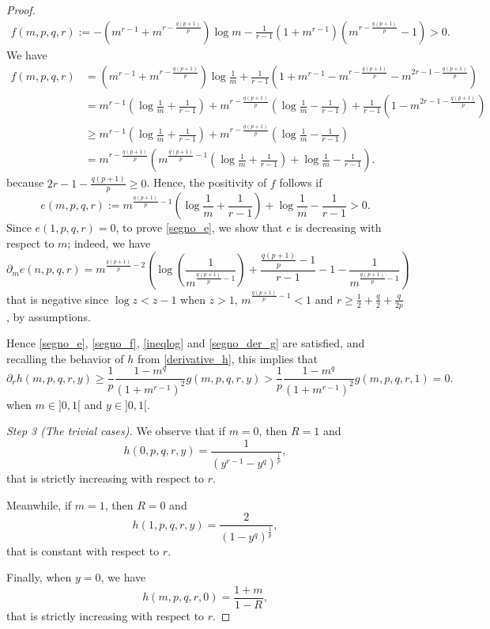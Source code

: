 \documentclass{amsart}
\theoremstyle{definition}
\theoremstyle{remark}
\newcommand{\de}{\partial}
\begin{document}
\begin{proof}
\begin{multline}
f(m,p,q,r):=-\left(m^{r-1}+m^{r-\frac{q(p+1)}p}\right)\log m - \frac1{r-1}\left(1+m^{r-1}\right)\left(m^{r-\frac{q(p+1)}p}-1\right) > 0.
\end{multline}
We have
\begin{equation*}
\begin{split}
f(m,p,q,r)&=\left(m^{r-1}+m^{r-\frac{q(p+1)}p}\right)\log\frac{1}{m} +\frac1{r-1} \left( 1+m^{r-1}-m^{r-\frac{q(p+1)}p}-m^{2r-1-\frac{q(p+1)}p}\right)\\
&= m^{r-1}\left(\log\frac 1m+\frac1{r-1} \right)+ m^{r-\frac{q(p+1)}p}\left(\log\frac1m-\frac1{r-1} \right)+\frac1{r-1} \left(1-m^{2r-1-\frac{q(p+1)}p}\right)\\
&\ge m^{r-1}\left(\log\frac 1m+\frac1{r-1}\right)+ m^{r-\frac{q(p+1)}p}\left(\log\frac1m-\frac1{r-1}\right)\\
&=m^{r-\frac{q(p+1)}p}\left(m^{\frac{q(p+1)}p-1}\left(\log\frac 1m+\frac1{r-1}\right)+\log\frac 1m-\frac1{r-1}\right).
\end{split}
\end{equation*}
because $2r-1-\frac{q(p+1)}p\ge0$.
Hence, the positivity of $f$ follows if
\begin{equation}
\label{segno_e}
e(m,p,q,r):=m^{\frac{q(p+1)}p-1}\left(\log\frac 1m+\frac1{r-1}\right)+\log\frac 1m-\frac1{r-1}>0.
\end{equation}
Since $e(1,p,q,r)=0$, to prove \eqref{segno_e}, we show that $e$ is decreasing with respect to $m$; indeed, we have
\[
\partial_m e (n,p,q,r)=m^{\frac{q(p+1)}p-2}\left(\log\left( \frac 1{m^{\frac{q(p+1)}p-1}} \right)+\frac {\frac{q(p+1)}p-1}{r-1} -1-\frac1{m^{\frac{q(p+1)}p-1}} \right)
\]
that is negative since $\log z < z-1$ when $z>1$, $m^{\frac{q(p+1)}p-1}<1$ and $r\ge\frac 12+\frac q2 +\frac q{2p}$, by assumptions.

Hence \eqref{segno_e}, \eqref{segno_f}, \eqref{ineqlog} and \eqref{segno_der_g} are satisfied, and recalling the behavior of $h$ from \eqref{derivative_h}, this implies that
\[
\de_{r}h (m,p,q,r,y)\ge \frac1p\frac{1-m^{q}}{(1+m^{r-1})^{2}} g(m,p,q,r,y)> \frac1p\frac{1-m^{q}}{(1+m^{r-1})^{2}} 
g(m,p,q,r,1)=0.
\]
when $m\in]0,1[$ and $y\in]0,1[$.
%
%
%

\textit{Step 3 (The trivial cases).} We observe that if $m=0$, then $R=1$ and 
\[h(0,p,q,r,y)=\frac{1}{ (y^{r-1}- y^q)^\frac 1 p},
\]
that is strictly increasing with respect to $r$.

Meanwhile, if $m=1$, then $R=0$ and
\[
h(1,p,q,r,y)=\frac{2}{ (1- y^q)^\frac 1 p}, 
\]
that is constant with respect to $r$. 

Finally, when $y=0$, we have
\[
h(m,p,q,r,0)=\frac{1+m}{1-R},
\]
that is strictly increasing with respect to $r$.
\end{proof}
\end{document}
